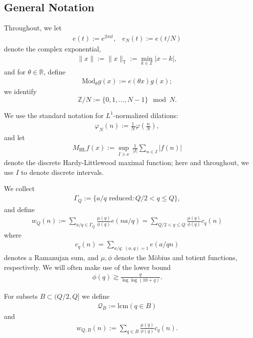 \documentclass[12pt]{amsart}
\numberwithin{equation}{section}
\theoremstyle{definition}
\begin{document}
\subsection{General Notation}
Throughout, we let
\begin{align}
    e(t) := e^{2 \pi i t}, \; \; \; e_N(t) := e(t/N)
\end{align}
denote the complex exponential,
\begin{align}
    \| x \| := \| x \|_{\mathbb{T}} := \min_{k \in \mathbb{Z}} |x-k|,
\end{align}
and for $\theta \in \mathbb{R}$, define
\begin{align}
    \text{Mod}_\theta g(x) := e(\theta x) g(x);
\end{align}
we identify 
\[ \mathbb{Z}/N := \{ 0,1,\dots, N-1\} \mod N.\]

We use the standard notation for $L^1$-normalized dilations:
\begin{align}
    \varphi_N(n) := \frac{1}{N} \varphi(\frac{n}{N}),
\end{align}
and let
\begin{align}
    M_{\text{HL}} f(x):=  \sup_{I \ni x} \, \frac{1}{|I|} \sum_{n \in I} |f(n)|  
\end{align}
denote the discrete Hardy-Littlewood maximal function; here and throughout, we use $I$ to denote discrete intervals.

We collect
\begin{align}\label{e:GammaQ}
    \Gamma_Q := \{ a/q \text{ reduced} : Q/2 < q \leq Q \},
\end{align}
and define
\begin{align}\label{e:WQ}
    w_Q(n) := \sum_{a/q \in \Gamma_Q} \frac{\mu(q)}{\phi(q)} e(na/q ) = \sum_{Q/2 < q \leq Q} \frac{\mu(q)}{\phi(q)} c_q(n)
\end{align}
where
\begin{align}\label{e:ram}
c_q(n) = \sum_{a/q : \ (a,q) =1} e(a/q n)
\end{align}
denotes a Ramanujan sum, and $\mu,\phi$ denote the M\"{o}bius and totient functions, respectively. We will often make use of the lower bound
\begin{align}\label{e:totientbound}
    \phi(q) \gtrsim \frac{q}{\log \log (10 + q)}.
\end{align}

For subsets $B \subset (Q/2,Q]$
we define
\begin{align}\label{e:lcmQ}
\mathcal{Q}_B := \text{lcm}( q \in B )
\end{align}
and
\begin{align}
w_{Q,B}(n) := \sum_{q \in B} \frac{\mu(q)}{\phi(q)} c_q(n).    
\end{align}
\end{document}
